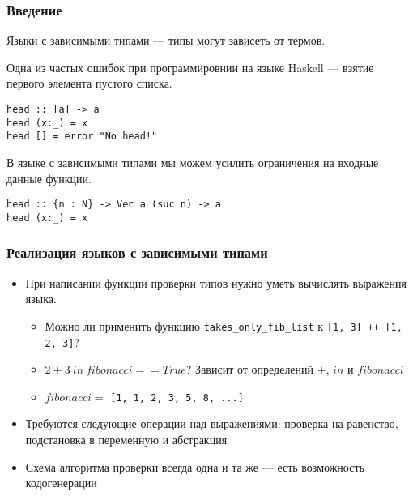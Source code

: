 
\begin{frame}[fragile]
\frametitle{Введение}

Языки с зависимыми типами --- типы могут зависеть от термов.

Одна из частых ошибок при программировнии на языке Haskell --- взятие первого элемента пустого списка.

\begin{verbatim}
head :: [a] -> a
head (x:_) = x
head [] = error "No head!"
\end{verbatim}

В языке с зависимыми типами мы можем усилить ограничения на входные данные функции.

\begin{verbatim}
head :: {n : N} -> Vec a (suc n) -> a
head (x:_) = x
\end{verbatim}

\end{frame}

\begin{frame}
\frametitle{Реализация языков с зависимыми типами}

\begin{itemize}
\item При написании функции проверки типов нужно уметь вычислять выражения языка.
  \begin{itemize}
    \item Можно ли применить функцию \lstinline{takes_only_fib_list} к \lstinline{[1, 3] ++ [1, 2, 3]}?
    \item $2 + 3\ in\ fibonacci == True$? Зависит от определений $+$, $in$ и $fibonacci$
    \item $fibonacci =$ \lstinline{[1, 1, 2, 3, 5, 8, ...]}
  \end{itemize}
\item Требуются следующие операции над выражениями: проверка на равенство, подстановка в переменную и абстракция
\item Схема алгоритма проверки всегда одна и та же --- есть возможность кодогенерации

\end{itemize}

\end{frame}

